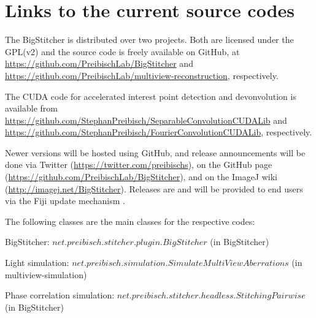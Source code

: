 
\section{Links to the current source codes}
\label{sec:currentcode}

The BigStitcher is distributed over two projects. Both are licensed under the GPL(v2) and the source code is freely available on GitHub, at \url{https://github.com/PreibischLab/BigStitcher} and \url{https://github.com/PreibischLab/multiview-reconstruction}, respectively.

The CUDA code for accelerated interest point detection and devonvolution is available from \url{https://github.com/StephanPreibisch/SeparableConvolutionCUDALib} and \url{https://github.com/StephanPreibisch/FourierConvolutionCUDALib}, respectively.


Newer versions will be hosted using GitHub, and release announcements will be done via Twitter (\url{https://twitter.com/preibischs}), on the GitHub page (\url{https://github.com/PreibischLab/BigStitcher}), and on the ImageJ wiki (\url{http://imagej.net/BigStitcher}). Releases are and will be provided to end users via the Fiji update mechanism \cite{imagej}.

The following classes are the main classes for the respective codes:

BigStitcher: $net.preibisch.stitcher.plugin.BigStitcher$ (in BigStitcher)

Light simulation: $net.preibisch.simulation.SimulateMultiViewAberrations$ (in multiview-simulation)

Phase correlation simulation: $net.preibisch.stitcher.headless.StitchingPairwise$ (in BigStitcher)

\section{}
\label{sec:bugs}

